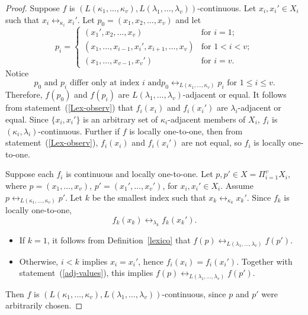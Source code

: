 \documentclass{article}
\theoremstyle{plain}
\theoremstyle{definition}
\numberwithin{thm}{section}
\newcommand{\adj}{\leftrightarrow}
\begin{document}
\begin{proof}
Suppose $f$ is $(L(\kappa_1,\ldots,\kappa_v),L(\lambda_1,\ldots,\lambda_v))$-continuous.
Let $x_i,x_i' \in X_i$ such that
$x_i \adj_{\kappa_i} x_i'$. Let
$p_0=(x_1,x_2, \ldots, x_v)$ and 
let
\[ p_i = \left \{ \begin{array}{ll}
(x_1', x_2, \ldots, x_v) & \mbox{for } i=1; \\
(x_1, \ldots, x_{i-1}, x_i',
 x_{i+1}, \ldots, x_v) & \mbox{for } 1 < i < v; \\
 (x_1, \ldots, x_{v-1}, x_v') &
 \mbox{for } i=v.
\end{array} \right .   
\]
Notice
\begin{equation}
\label{Lex-observ}
\mbox{$p_0$ and $p_i$ differ
only at index $i$ and
$p_0 \adj_{L(\kappa_1,\ldots,\kappa_v)} p_i$ for $1 \le i \le v$.}
\end{equation}
Therefore,
$f(p_0)$ and $f(p_i)$ are
$L(\lambda_1,\ldots,\lambda_v)$-adjacent or equal. It follows from
statement~(\ref{Lex-observ}) that $f_i(x_i)$ and $f_i(x_i')$
are $\lambda_i$-adjacent or equal. Since $\{x_i,x_i'\}$ is
an arbitrary set of $\kappa_i$-adjacent members of
$X_i$, $f_i$ is $(\kappa_i,\lambda_i)$-continuous. Further
if $f$ is locally one-to-one,
then from statement~(\ref{Lex-observ}), $f_i(x_i)$ and $f_i(x_i')$
are not equal, so $f_i$ is locally one-to-one.

Suppose each $f_i$ is continuous
and locally one-to-one.
Let $p,p' \in X = \Pi_{i=1}^v X_i$, where
$p=(x_1,\ldots,x_v)$, $p'=(x_1',\ldots,x_v')$, for
$x_i,x_i' \in X_i$. Assume
$p \adj_{L(\kappa_1,\ldots,\kappa_v)} p'$. Let $k$ be
the smallest index such that
$x_k \adj_{\kappa_k} x_k'$.
Since $f_k$ is locally
one-to-one,
\begin{equation}
\label{adj-values}
f_k(x_k) \adj_{\lambda_k} f_k(x_k').
\end{equation}
\begin{itemize}
\item If $k=1$, it follows
from Definition~\ref{lexico} that
$f(p) \adj_{L(\lambda_1,\ldots,\lambda_v)} f(p')$.
\item Otherwise, $i < k$ implies
      $x_i = x_i'$, hence
      $f_i(x_i) = f_i(x_i')$.
      Together with statement~(\ref{adj-values}), this implies
      $f(p) \adj_{L(\lambda_1,\ldots,\lambda_v)} f(p')$.
\end{itemize}
Then $f$ is
$(L(\kappa_1,\ldots,\kappa_v),L(\lambda_1,\ldots,\lambda_v))$-continuous, since $p$ and $p'$ were arbitrarily chosen.
\end{proof}
\end{document}

